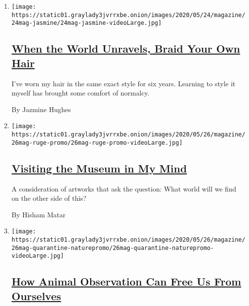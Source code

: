 \begin{enumerate}
\def\labelenumi{\arabic{enumi}.}
\item
  \texttt{[image: https://static01.graylady3jvrrxbe.onion/images/2020/05/24/magazine/24mag-jasmine/24mag-jasmine-videoLarge.jpg]}

  \hypertarget{when-the-world-unravels-braid-your-own-hair}{%
  \subsection{\texorpdfstring{\href{/interactive/2020/05/16/magazine/covid-quarantine-hair-braids.html}{When
  the World Unravels, Braid Your Own
  Hair}}{When the World Unravels, Braid Your Own Hair}}\label{when-the-world-unravels-braid-your-own-hair}}

  I've worn my hair in the same exact style for six years. Learning to
  style it myself has brought some comfort of normalcy.

  By Jazmine Hughes
\item
  \texttt{[image: https://static01.graylady3jvrrxbe.onion/images/2020/05/26/magazine/26mag-ruge-promo/26mag-ruge-promo-videoLarge.jpg]}

  \hypertarget{visiting-the-museum-in-my-mind}{%
  \subsection{\texorpdfstring{\href{/interactive/2020/05/15/magazine/covid-quarantine-willi-ruge.html}{Visiting
  the Museum in My
  Mind}}{Visiting the Museum in My Mind}}\label{visiting-the-museum-in-my-mind}}

  A consideration of artworks that ask the question: What world will we
  find on the other side of this?

  By Hisham Matar
\item
  \texttt{[image: https://static01.graylady3jvrrxbe.onion/images/2020/05/26/magazine/26mag-quarantine-naturepromo/26mag-quarantine-naturepromo-videoLarge.jpg]}

  \hypertarget{how-animal-observation-can-free-us-from-ourselves}{%
  \subsection{\texorpdfstring{\href{/interactive/2020/05/11/magazine/quarantine-nature.html}{How
  Animal Observation Can Free Us From
  Ourselves}}{How Animal Observation Can Free Us From Ourselves}}\label{how-animal-observation-can-free-us-from-ourselves}}


\end{enumerate}
